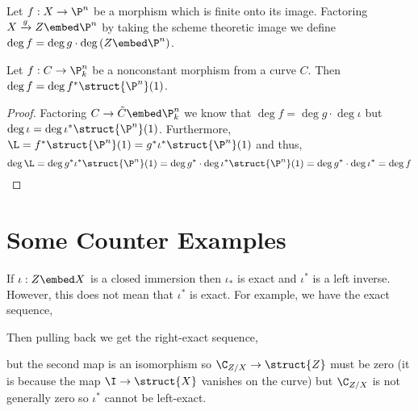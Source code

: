 \documentclass[12pt]{article}
\begin{document}
\begin{defn}
Let $f : X \to \P^n$ be a morphism which is finite onto its image. Factoring $X \xrightarrow{g} Z \embed \P^n$ by taking the scheme theoretic image we define $\deg{f} = \deg{g} \cdot \deg{(Z \embed \P^n)}$.
\end{defn}

\begin{prop}
Let $f : C \to \P^n_k$ be a nonconstant morphism from a curve $C$. Then $\deg{f} = \deg{f^* \struct{\P^n}(1)}$.
\end{prop}

\begin{proof}
Factoring $C \to \tilde{C} \embed \P^n_k$ we know that $\deg{f} = \deg{g} \cdot \deg{\iota}$ but $\deg{\iota} = \deg{\iota^* \struct{\P^n}(1)}$. Furthermore, $\L = f^* \struct{\P^n}(1) = g^* \iota^* \struct{\P^n}(1)$ and thus,
\[ \deg{\L} = \deg{g^* \iota^* \struct{\P^n}(1)} = \deg{g^*} \cdot \deg{\iota^* \struct{\P^n}(1)} = \deg{g^*} \cdot \deg{\iota^*} = \deg{f} \]
\end{proof}

\section{Some Counter Examples}

\begin{example}
If $\iota : Z \embed X$ is a closed immersion then $\iota_*$ is exact and $\iota^*$ is a left inverse. However, this does not mean that $\iota^*$ is exact. For example, we have the exact sequence,
\begin{center}
\end{center}
Then pulling back we get the right-exact sequence,
\begin{center}
\end{center}
but the second map is an isomorphism so $\C_{Z/X} \to \struct{Z}$ must be zero (it is because the map $\I \to \struct{X}$ vanishes on the curve) but $\C_{Z/X}$ is not generally zero so $\iota^*$ cannot be left-exact.
\end{example}
\end{document}
